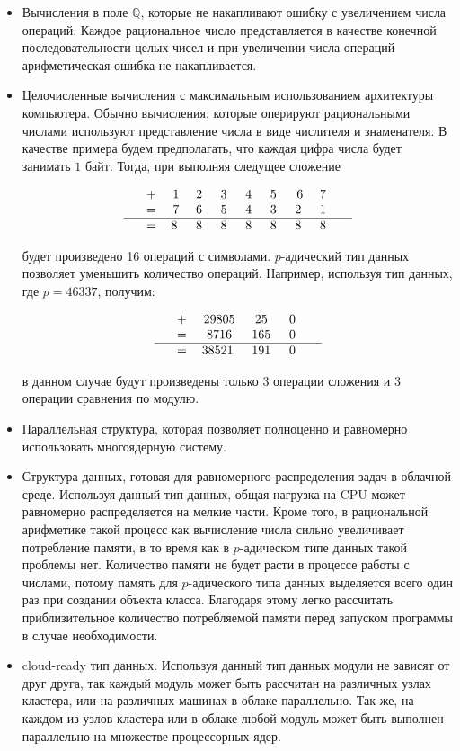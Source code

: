 \documentclass[master, och, diploma, times]{sty/SCWorks}
\theoremstyle{plain}
\theoremstyle{definition}
\begin{document}
\begin{itemize}

\item Вычисления в поле $\mathbb{Q}$, которые не накапливают ошибку с увеличением числа операций. Каждое рациональное число представляется в качестве конечной последовательности целых чисел и при увеличении числа операций арифметическая ошибка не накапливается.

\item Целочисленные вычисления с максимальным использованием архитектуры компьютера. Обычно вычисления, которые оперируют рациональными числами используют представление числа в виде числителя и знаменателя. В качестве примера будем предполагать, что каждая цифра числа будет занимать $1$ байт. Тогда, при выполняя следущее сложение

$$
\begin{tabular}{ccccccccccc}
& + & 1 & 2\; & 3\; & 4\; & 5\; & 6 & 7\; &  \\
& = & 7 & 6\; & 5\; & 4\; & 3\; & 2\; & 1\; &  \\
\hline
& = & 8\; & 8\; & 8\; & 8\; & 8\; & 8\; & 8\; &
\end{tabular}
$$

будет произведено 16 операций с символами. $p$-адический тип данных позволяет уменьшить количество операций. Например, используя тип данных, где $p=46337$, получим:

$$
\begin{tabular}{ccccccccccc}
& + & 29805 & 25\; & 0\; &  \\
& = & 8716 & 165\; & 0\; & \\
\hline
& = & 38521\; & 191\; & 0\; &
\end{tabular}
$$

в данном случае будут произведены только $3$ операции сложения и $3$ операции сравнения по модулю.

\item Параллельная структура, которая позволяет полноценно и равномерно использовать многоядерную систему.
\item Структура данных, готовая для равномерного распределения задач в облачной среде. Используя данный тип данных, общая нагрузка на CPU может равномерно распределяется на мелкие части. Кроме того, в рациональной арифметике такой процесс как вычисление числа сильно увеличивает потребление памяти, в то время как в $p$-адическом типе данных такой проблемы нет. Количество памяти не будет расти в процессе работы с числами, потому память для $p$-адического типа данных выделяется всего один раз при создании объекта класса. Благодаря этому легко рассчитать приблизительное количество потребляемой памяти перед запуском программы в случае необходимости.
\item cloud-ready тип данных. Используя данный тип данных модули не зависят от друг друга, так каждый модуль может быть рассчитан на различных узлах кластера, или на различных машинах в облаке параллельно. Так же, на каждом из узлов кластера или в облаке любой модуль может быть выполнен параллельно на множестве процессорных ядер.

\end{itemize}
\end{document}
